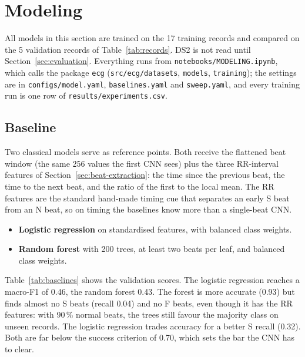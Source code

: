 \section{Modeling}
\label{sec:modeling}

All models in this section are trained on the 17 training records and compared on the 5 validation records of Table~\ref{tab:records}. DS2 is not read until Section~\ref{sec:evaluation}. Everything runs from \texttt{notebooks/MODELING.ipynb}, which calls the package \texttt{ecg} (\texttt{src/ecg/datasets}, \texttt{models}, \texttt{training}); the settings are in \texttt{configs/model.yaml}, \texttt{baselines.yaml} and \texttt{sweep.yaml}, and every training run is one row of \texttt{results/experiments.csv}.

\subsection{Baseline}
\label{sec:baseline}

Two classical models serve as reference points. Both receive the flattened beat window (the same 256 values the first CNN sees) plus the three RR-interval features of Section~\ref{sec:beat-extraction}: the time since the previous beat, the time to the next beat, and the ratio of the first to the local mean. The RR features are the standard hand-made timing cue that separates an early S beat from an N beat, so on timing the baselines know more than a single-beat CNN.

\begin{itemize}[nosep]
  \item \textbf{Logistic regression} on standardised features, with balanced class weights.
  \item \textbf{Random forest} with 200 trees, at least two beats per leaf, and balanced class weights.
\end{itemize}



Table~\ref{tab:baselines} shows the validation scores. The logistic regression reaches a macro-F1 of 0.46, the random forest 0.43. The forest is more accurate (0.93) but finds almost no S beats (recall 0.04) and no F beats, even though it has the RR features: with 90\,\% normal beats, the trees still favour the majority class on unseen records. The logistic regression trades accuracy for a better S recall (0.32). Both are far below the success criterion of 0.70, which sets the bar the CNN has to clear.

